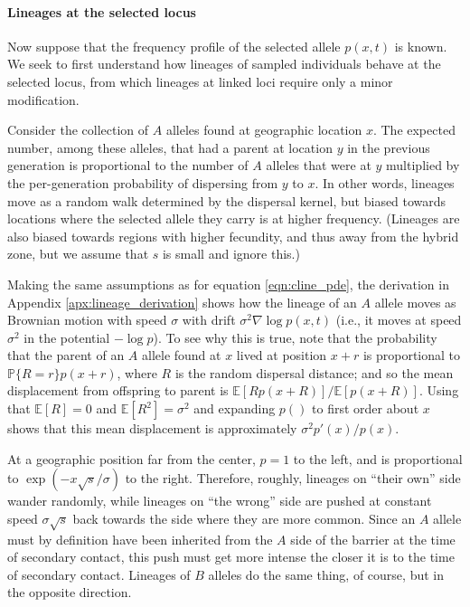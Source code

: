 \documentclass[11pt,letterpaper]{article}
\newcommand{\alisa}[1]{{\em \color{red} #1}}
\newcommand{\E}{\mathbb{E}}
\renewcommand{\P}{\mathbb{P}}
\newcommand{\grad}{\nabla}
\begin{document}
\paragraph{Lineages at the selected locus}
Now suppose that the frequency profile of the selected allele $p(x,t)$ is known.
We seek to first understand how lineages of sampled individuals behave at the selected locus,
from which lineages at linked loci require only a minor modification.

Consider the collection of $A$ alleles found at geographic location $x$.
The expected number, among these alleles, that had a parent at location $y$ in the previous generation 
is proportional to the number of $A$ alleles that were at $y$ multiplied by the per-generation probability of dispersing from $y$ to $x$. 
In other words, lineages move as a random walk determined by the dispersal kernel,
but biased towards locations where the selected allele they carry is at higher frequency.
(Lineages are also biased towards regions with higher fecundity,
and thus away from the hybrid zone, but we assume that $s$ is small and ignore this.)

Making the same assumptions as for equation \eqref{eqn:cline_pde}, the derivation in Appendix \ref{apx:lineage_derivation} shows 
how the lineage of an $A$ allele moves as Brownian motion with speed $\sigma$
with drift $\sigma^2 \grad \log p(x,t)$ (i.e., it moves at speed $\sigma^2$ in the potential $-\log p$).
To see why this is true, note that the probability that the parent of an $A$ allele found at $x$
lived at position $x+r$ is proportional to $\P\{R=r\} p(x+r)$, where $R$ is the random dispersal distance;
and so the mean displacement from offspring to parent is $\E[R p(x+R)]/\E[p(x+R)]$.
Using that $\E[R]=0$ and $\E[R^2]=\sigma^2$
and expanding $p()$ to first order about $x$ shows that this mean displacement is approximately $\sigma^2 p'(x)/p(x)$.

At a geographic position far from the center, $p=1$ to the left, and is proportional to  $\exp(-x\sqrt{s}/\sigma)$ to the right.
Therefore, roughly, lineages on ``their own'' side wander randomly,
while lineages on ``the wrong'' side are pushed at constant speed $\sigma\sqrt{s}$ 
back towards the side where they are more common. 
Since an $A$ allele must by definition have been inherited from the $A$ side of the barrier 
at the time of secondary contact, this push must get more intense the closer it is to the time of secondary contact.
Lineages of $B$ alleles do the same thing, of course, but in the opposite direction. 
\end{document}
